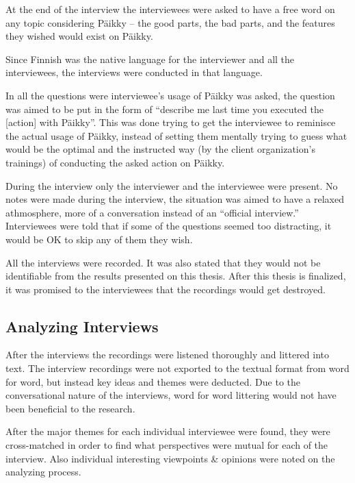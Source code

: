 At the end of the interview the interviewees were asked to have a free word on any topic considering Päikky -- the good parts, the bad parts, and the features they wished would exist on Päikky.

Since Finnish was the native language for the interviewer and all the interviewees, the interviews were conducted in that language.

In all the questions were interviewee's usage of Päikky was asked, the question was aimed to be put in the form of ``describe me last time you executed the [action] with Päikky''. This was done trying to get the interviewee to reminisce the actual usage of Päikky, instead of setting them mentally trying to guess what would be the optimal and the instructed way (by the client organization's trainings) of conducting the asked action on Päikky.

During the interview only the interviewer and the interviewee were present. No notes were made during the interview, the situation was aimed to have a relaxed athmosphere, more of a conversation instead of an ``official interview.'' Interviewees were told that if some of the questions seemed too distracting, it would be OK to skip any of them they wish.

All the interviews were recorded.  It was also stated that they would not be identifiable from the results presented on this thesis. After this thesis is finalized, it was promised to the interviewees that the recordings would get destroyed.




\subsection{Analyzing Interviews}

After the interviews the recordings were listened thoroughly and littered into text. The interview recordings were not exported to the textual format from word for word, but instead key ideas and themes were deducted. Due to the conversational nature of the interviews, word for word littering would not have been beneficial to the research. 

After the major themes for each individual interviewee were found, they were cross-matched in order to find what perspectives were mutual for each of the interview. Also individual interesting viewpoints & opinions were noted on the analyzing process.




